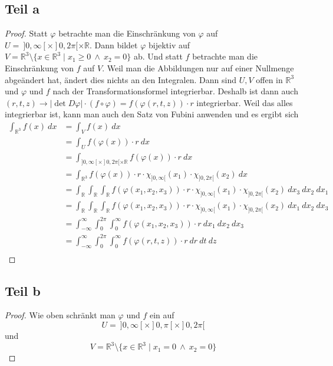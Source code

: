\documentclass[10pt,a4paper]{article}
\begin{document}
\subsection{Teil a}
\begin{proof}
  Statt $\varphi$ betrachte man die Einschränkung von $\varphi$ auf $U =\ ]0, \infty[ \times ]0, 2\pi[ \times \mathbb{R}$.
  Dann bildet $\varphi$ bijektiv auf $V = \mathbb{R}^{3} \setminus \{ x \in \mathbb{R}^{3} \mid x_{1} \ge 0\ \land\ x_{2} = 0 \}$ ab.
  Und statt $f$ betrachte man die Einschränkung von $f$ auf $V$.
  Weil man die Abbildungen nur auf einer Nullmenge abgeändert hat, ändert dies nichts an den Integralen.
  Dann sind $U, V$ offen in $\mathbb{R}^{3}$ und $\varphi$ und $f$ nach der Transformationsformel integrierbar.
  Deshalb ist dann auch $(r, t, z) \rightarrow |\det D\varphi| \cdot (f \circ \varphi) = f(\varphi(r, t, z)) \cdot r$ integrierbar.
  Weil das alles integrierbar ist, kann man auch den Satz von Fubini anwenden und es ergibt sich
  \begin{align*}
    \int_{\mathbb{R}^{3}} f(x)\ dx & = \int_{V} f(x)\ dx\\
    & = \int_{U} f(\varphi(x)) \cdot r\ dx\\
    & = \int_{]0, \infty[ \times ]0, 2\pi[ \times \mathbb{R}} f(\varphi(x)) \cdot r\ dx\\
    & = \int_{\mathbb{R}^{3}} f(\varphi(x)) \cdot r \cdot \chi_{]0, \infty[}(x_{1}) \cdot \chi_{]0, 2\pi[}(x_{2})\ dx\\
    & = \int_{\mathbb{R}} \int_{\mathbb{R}} \int_{\mathbb{R}} f(\varphi(x_{1}, x_{2}, x_{3})) \cdot r \cdot \chi_{]0, \infty[}(x_{1}) \cdot \chi_{]0, 2\pi[}(x_{2})\ dx_{3}\ dx_{2}\ dx_{1}\\
    & = \int_{\mathbb{R}} \int_{\mathbb{R}} \int_{\mathbb{R}} f(\varphi(x_{1}, x_{2}, x_{3})) \cdot r \cdot \chi_{]0, \infty[}(x_{1}) \cdot \chi_{]0, 2\pi[}(x_{2})\ dx_{1}\ dx_{2}\ dx_{3}\\
    & = \int_{-\infty}^{\infty} \int_{0}^{2\pi} \int_{0}^{\infty} f(\varphi(x_{1}, x_{2}, x_{3})) \cdot r\ dx_{1}\ dx_{2}\ dx_{3}\\
    & = \int_{-\infty}^{\infty} \int_{0}^{2\pi} \int_{0}^{\infty} f(\varphi(r, t, z)) \cdot r\ dr\ dt\ dz\\
  \end{align*}
\end{proof}

\subsection{Teil b}
\begin{proof}
  Wie oben schränkt man $\varphi$ und $f$ ein auf
  \begin{equation}
    U =\ ]0, \infty[ \times ]0, \pi[ \times ]0, 2\pi[
  \end{equation}
  und
  \begin{equation}
    V = \mathbb{R}^{3} \setminus \{ x \in \mathbb{R}^{3} \mid x_{1} = 0\ \land\ x_{2} = 0 \}
  \end{equation}
\end{proof}
\end{document}
